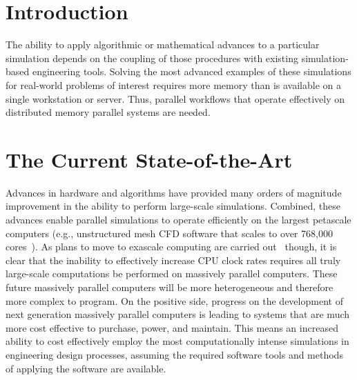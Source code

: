 \section{Introduction}
The ability to apply algorithmic or mathematical advances to a particular
simulation depends on the coupling of those procedures with existing
simulation-based engineering tools.
Solving the most advanced examples of these simulations for real-world problems
of interest requires more memory than is available on a single workstation or
server.
Thus, parallel workflows that operate effectively on distributed memory
parallel systems are needed.

\section{The Current State-of-the-Art}

Advances in hardware and algorithms have provided many orders of magnitude
improvement in the ability to perform large-scale simulations.
Combined, these advances enable parallel simulations to operate efficiently on
the largest petascale computers (e.g., unstructured mesh CFD software that
scales to over 768,000 cores~\cite{rasquinCise2014}).
As plans to move to exascale computing are carried out~\cite{Exa10} though, it
is clear that the inability to effectively increase CPU clock rates requires all
truly large-scale computations be performed on massively parallel computers.
These future massively parallel computers will be more heterogeneous and
therefore more complex to program.
On the positive side, progress on the development of next generation massively
parallel computers is leading to systems that are much more cost effective to
purchase, power, and maintain.
This means an increased ability to cost effectively employ the most
computationally intense simulations in engineering design processes, assuming the
required software tools and methods of applying the software are available.

